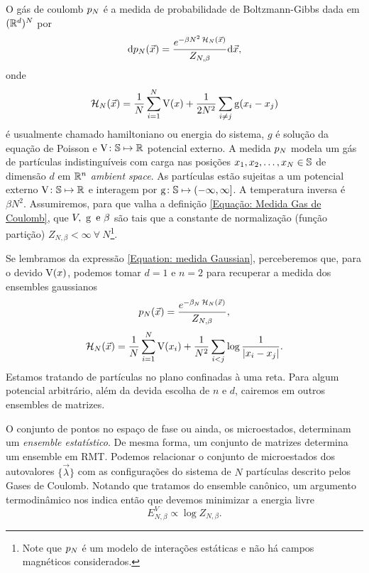 \documentclass[12pt]{report}
\begin{document}
O gás de coulomb $p_N$ \cite{ChafaCoulombMeasure} é a medida de probabilidade de Boltzmann-Gibbs dada em $(\mathbb{R}^d)^N$ por 
\begin{equation}
	\mathrm{d} p_N(\vec{x}) = \frac{e^{-\beta N^2 \operatorname{\mathcal{H}}_N(\vec{x})}}{Z_{N,\beta}} \mathrm{d} \vec{x},
	\label{Equação: Medida Gas de Coulomb}
\end{equation}
onde $$\operatorname{\mathcal{H}}_N(\vec{x}) = \frac{1}{N} \sum_{i = 1}^{N} \operatorname{V}(x) + \frac{1}{2N^2} \sum_{i \neq j} \operatorname{g}(x_i - x_j)$$ é usualmente chamado hamiltoniano ou energia do sistema, $g$ é solução da equação de Poisson e $\operatorname{V} \colon \mathbb{S} \mapsto \mathbb{R}$ potencial externo. A medida $p_N$ modela um gás de partículas indistinguíveis com carga nas posições $x_1, x_2, \dots, x_N \in \mathbb{S}$ de dimensão $d$ em $\mathbb{R}^n$ \textit{ambient space}. As partículas estão sujeitas a um potencial externo $\operatorname{V} \colon \mathbb{S} \mapsto \mathbb{R}$ e interagem por $\operatorname{g} \colon \mathbb{S} \mapsto (-\infty, \infty]$. A temperatura inversa é $\beta N^2$. Assumiremos, para que valha a definição \ref{Equação: Medida Gas de Coulomb}, que $V, \ \g \ \text{e} \ \beta$ são tais que a constante de normalização (função partição) $Z_{N, \beta} < \infty \ \forall \ N$\footnote{Note que $p_N$ é um modelo de interações estáticas e não há campos magnéticos considerados.}.

Se lembramos da expressão \ref{Equation: medida Gaussian}, perceberemos que, para o devido $\operatorname{V}(x)$, podemos tomar $d=1$ e $n = 2$ para recuperar a medida dos ensembles gaussianos 
\begin{equation}
	p_N(\vec{x}) = \frac{e^{-\beta_N \operatorname{\mathcal{H}}_N(\vec{x})}}{Z_{N,\beta}},
	\label{Equation: Medida Log V}
\end{equation}
\begin{equation}
	\operatorname{\mathcal{H}}_N(\vec{x}) = \frac{1}{N} \sum_{i = 1}^{N} \operatorname{V}(x_i) + \frac{1}{N^2} \sum_{i < j} \log{\frac{1}{|x_i - x_j|}}.
\end{equation}
Estamos tratando de partículas no plano confinadas à uma reta. Para algum potencial arbitrário, além da devida escolha de $n$ e $d$, cairemos em outros ensembles de matrizes.

O conjunto de pontos no espaço de fase ou ainda, os microestados, determinam um \textit{ensemble estatístico}. De mesma forma, um conjunto de matrizes determina um ensemble em RMT. Podemos relacionar o conjunto de microestados dos autovalores $\{\vec{\lambda}\}$ com as configurações do sistema de $N$ partículas descrito pelos Gases de Coulomb. Notando que tratamos do ensemble canônico, um argumento termodinâmico nos indica então que devemos minimizar a energia livre $$E^V_{N,\beta} \propto \log{Z_{N, \beta}}.$$
\end{document}
